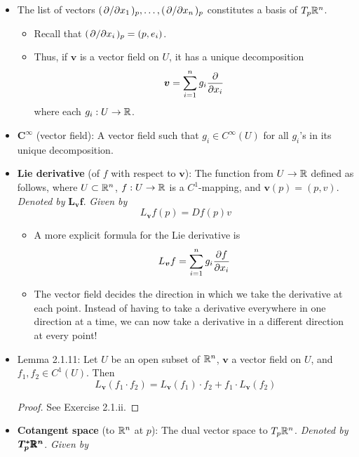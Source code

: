 \documentclass[../notes.tex]{subfiles}
\begin{document}
\begin{itemize}
\begin{itemize}
    \end{itemize}
    \item The list of vectors $(\pdv*{x_1})_p,\dots,(\pdv*{x_n})_p$ constitutes a basis of $T_p\mathbb{R}^n$.
    \begin{itemize}
        \item Recall that $(\pdv*{x_i})_p=(p,e_i)$.
        \item Thus, if $\bm{v}$ is a vector field on $U$, it has a unique decomposition
        \begin{equation*}
            \bm{v} = \sum_{i=1}^ng_i\pdv{x_i}
        \end{equation*}
        where each $g_i:U\to\mathbb{R}$.
    \end{itemize}
    \item $\bm{C^\infty}$ (vector field): A vector field such that $g_i\in C^\infty(U)$ for all $g_i$'s in its unique decomposition.
    \item \textbf{Lie derivative} (of $f$ with respect to $\bm{v}$): The function from $U\to\mathbb{R}$ defined as follows, where $U\subset\mathbb{R}^n$, $f:U\to\mathbb{R}$ is a $C^1$-mapping, and $\bm{v}(p)=(p,v)$. \emph{Denoted by} $\bm{L_{\pmb{v}}f}$. \emph{Given by}
    \begin{equation*}
        L_{\bm{v}}f(p) = Df(p)v
    \end{equation*}
    \begin{itemize}
        \item A more explicit formula for the Lie derivative is
        \begin{equation*}
            L_{\bm{v}}f = \sum_{i=1}^ng_i\pdv{f}{x_i}
        \end{equation*}
        \item The vector field decides the direction in which we take the derivative at each point. Instead of having to take a derivative everywhere in one direction at a time, we can now take a derivative in a different direction at every point!
    \end{itemize}
    \item Lemma 2.1.11: Let $U$ be an open subset of $\mathbb{R}^n$, $\bm{v}$ a vector field on $U$, and $f_1,f_2\in C^1(U)$. Then
    \begin{equation*}
        L_{\bm{v}}(f_1\cdot f_2) = L_{\bm{v}}(f_1)\cdot f_2+f_1\cdot L_{\bm{v}}(f_2)
    \end{equation*}
    \begin{proof}
        See Exercise 2.1.ii.
    \end{proof}
    \item \textbf{Cotangent space} (to $\mathbb{R}^n$ at $p$): The dual vector space to $T_p\mathbb{R}^n$. \emph{Denoted by} $\bm{T_p^*\pmb{\mathbb{R}}^n}$. \emph{Given by}

\end{itemize}
\end{document}
